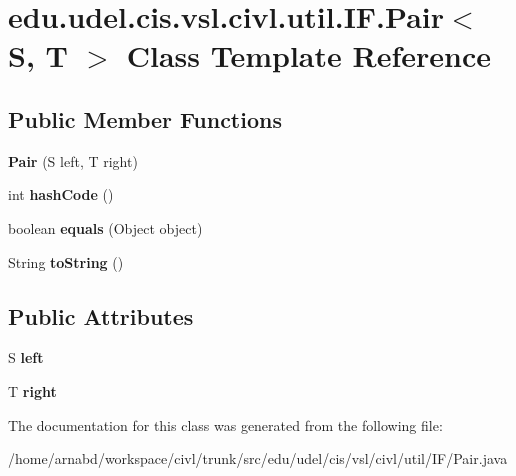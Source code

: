 \hypertarget{classedu_1_1udel_1_1cis_1_1vsl_1_1civl_1_1util_1_1IF_1_1Pair}{}\section{edu.\+udel.\+cis.\+vsl.\+civl.\+util.\+I\+F.\+Pair$<$ S, T $>$ Class Template Reference}
\label{classedu_1_1udel_1_1cis_1_1vsl_1_1civl_1_1util_1_1IF_1_1Pair}
\subsection*{Public Member Functions}
\begin{DoxyCompactItemize}
\item 
\hypertarget{classedu_1_1udel_1_1cis_1_1vsl_1_1civl_1_1util_1_1IF_1_1Pair_a69d9e3c92b3779e5da76988189b739ae}{}{\bfseries Pair} (S left, T right)\label{classedu_1_1udel_1_1cis_1_1vsl_1_1civl_1_1util_1_1IF_1_1Pair_a69d9e3c92b3779e5da76988189b739ae}

\item 
\hypertarget{classedu_1_1udel_1_1cis_1_1vsl_1_1civl_1_1util_1_1IF_1_1Pair_af8bfa8d9d1424ba3b7db0a95a3f87d64}{}int {\bfseries hash\+Code} ()\label{classedu_1_1udel_1_1cis_1_1vsl_1_1civl_1_1util_1_1IF_1_1Pair_af8bfa8d9d1424ba3b7db0a95a3f87d64}

\item 
\hypertarget{classedu_1_1udel_1_1cis_1_1vsl_1_1civl_1_1util_1_1IF_1_1Pair_aff3654094a93ffee71ab63ef4c77cc75}{}boolean {\bfseries equals} (Object object)\label{classedu_1_1udel_1_1cis_1_1vsl_1_1civl_1_1util_1_1IF_1_1Pair_aff3654094a93ffee71ab63ef4c77cc75}

\item 
\hypertarget{classedu_1_1udel_1_1cis_1_1vsl_1_1civl_1_1util_1_1IF_1_1Pair_a3e13f8caf619abf2a2eadd167769ae67}{}String {\bfseries to\+String} ()\label{classedu_1_1udel_1_1cis_1_1vsl_1_1civl_1_1util_1_1IF_1_1Pair_a3e13f8caf619abf2a2eadd167769ae67}

\end{DoxyCompactItemize}
\subsection*{Public Attributes}
\begin{DoxyCompactItemize}
\item 
\hypertarget{classedu_1_1udel_1_1cis_1_1vsl_1_1civl_1_1util_1_1IF_1_1Pair_a1317d1d6d3afb77ccbd22f9f997ea3e8}{}S {\bfseries left}\label{classedu_1_1udel_1_1cis_1_1vsl_1_1civl_1_1util_1_1IF_1_1Pair_a1317d1d6d3afb77ccbd22f9f997ea3e8}

\item 
\hypertarget{classedu_1_1udel_1_1cis_1_1vsl_1_1civl_1_1util_1_1IF_1_1Pair_a3fa6d95862e4eba2b0bc9b43a07e92fa}{}T {\bfseries right}\label{classedu_1_1udel_1_1cis_1_1vsl_1_1civl_1_1util_1_1IF_1_1Pair_a3fa6d95862e4eba2b0bc9b43a07e92fa}

\end{DoxyCompactItemize}


The documentation for this class was generated from the following file\+:\begin{DoxyCompactItemize}
\item 
/home/arnabd/workspace/civl/trunk/src/edu/udel/cis/vsl/civl/util/\+I\+F/Pair.\+java\end{DoxyCompactItemize}

